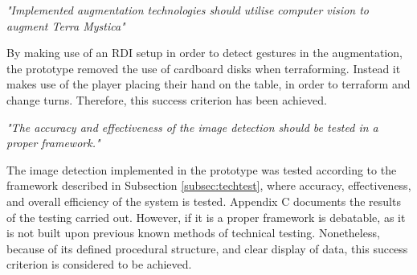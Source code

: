 \textit{"Implemented augmentation technologies should utilise computer vision to augment Terra Mystica"}

By making use of an RDI setup in order to detect gestures in the augmentation, the prototype removed the use of cardboard disks when terraforming. Instead it makes use of the player placing their hand on the table, in order to terraform and change turns. Therefore, this success criterion has been achieved.

\textit{"The accuracy and effectiveness of the image detection should be tested in a proper framework."}

The image detection implemented in the prototype was tested according to the framework described in Subsection \ref{subsec:techtest}, where accuracy, effectiveness, and overall efficiency of the system is tested. Appendix C documents the results of the testing carried out. However, if it is a proper framework is debatable, as it is not built upon previous known methods of technical testing. Nonetheless, because of its defined procedural structure, and clear display of data, this success criterion is considered to be achieved.